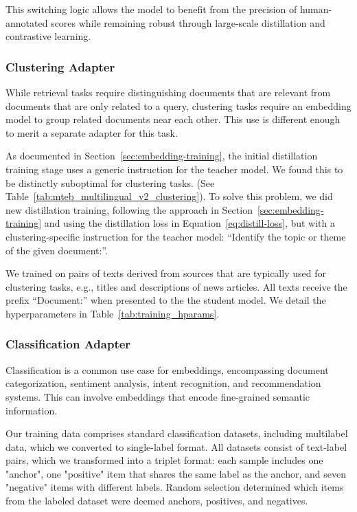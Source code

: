 \documentclass[11pt]{article}
\begin{document}
This switching logic allows the model to benefit from the precision of human-annotated scores while remaining robust through large-scale distillation and contrastive learning.



\subsubsection{Clustering Adapter}
\label{sec:cluster-adapter}

While retrieval tasks require distinguishing documents that are relevant from documents that are only related to a query, clustering tasks require an embedding model to group related documents near each other.
This use is different enough to merit a separate adapter for this task.

As documented in Section~\ref{sec:embedding-training}, the initial distillation training stage uses a generic instruction for the teacher model. We found this to be distinctly suboptimal for clustering tasks. (See Table~\ref{tab:mteb_multilingual_v2_clustering}). 
To solve this problem, we did new distillation training, following the approach in Section~\ref{sec:embedding-training} and using the distillation loss in Equation~\eqref{eq:distill-loss}, but with a clustering-specific instruction for the teacher model: ``Identify the topic or theme of the given document:''.

We trained on pairs of texts derived from sources that are typically used for clustering tasks, e.g., titles and descriptions of news articles.
All texts receive the prefix ``Document:'' when presented to the the student model.
We detail the hyperparameters in Table~\ref{tab:training_hparams}.

\subsubsection{Classification Adapter}
\label{sec:class-adapter}

Classification is a common use case for embeddings, encompassing document categorization, sentiment analysis, intent recognition, and recommendation systems. This can involve embeddings that encode fine-grained semantic information.

Our training data comprises standard classification datasets, including multilabel data, which we converted to single-label format. All datasets consist of text-label pairs, which we transformed into a triplet format: each sample includes one "anchor", one "positive" item that shares the same label as the anchor, and seven "negative" items with different labels. Random selection determined which items from the labeled dataset were deemed anchors, positives, and negatives.
\end{document}
